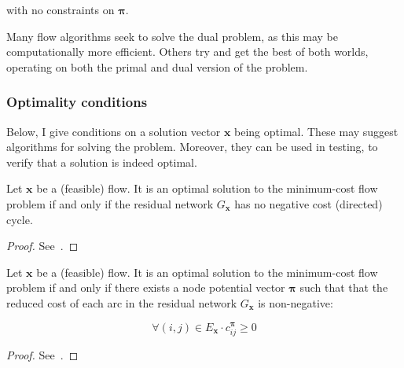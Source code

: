 with no constraints on $\boldsymbol{\pi}$.

Many flow algorithms seek to solve the dual problem, as this may be computationally more efficient. Others try and get the best of both worlds, operating on both the primal and dual version of the problem.

\subsubsection{Optimality conditions} \label{prep:flow-optimality}


Below, I give conditions on a solution vector $\mathbf{x}$ being optimal. These may suggest algorithms for solving the problem. Moreover, they can be used in testing, to verify that a solution is indeed optimal.\\

\begin{thm} \label{thm:optimality-neg-cycle}
Let $\mathbf{x}$ be a (feasible) flow. It is an optimal solution to the minimum-cost flow problem if and only if the residual network $G_\mathbf{x}$ has no negative cost (directed) cycle.
\end{thm}
\begin{proof}
See~\cite[p.~307]{Ahuja:1993}.
\end{proof}

\begin{thm} \label{thm:optimality-reduced-cost}
Let $\mathbf{x}$ be a (feasible) flow. It is an optimal solution to the minimum-cost flow problem if and only if there exists a node potential vector $\boldsymbol{\pi}$ such that that the reduced cost of each arc in the residual network $G_{\mathbf{x}}$ is non-negative:

\begin{equation} \label{eq:optimality-reduced-cost}
\forall(i,j)\in E_{\mathbf{x}}\cdot c_{ij}^{\boldsymbol{\pi}}\geq 0
\end{equation}
\end{thm}
\begin{proof}
See~\cite[p.~309]{Ahuja:1993}.
\end{proof}


